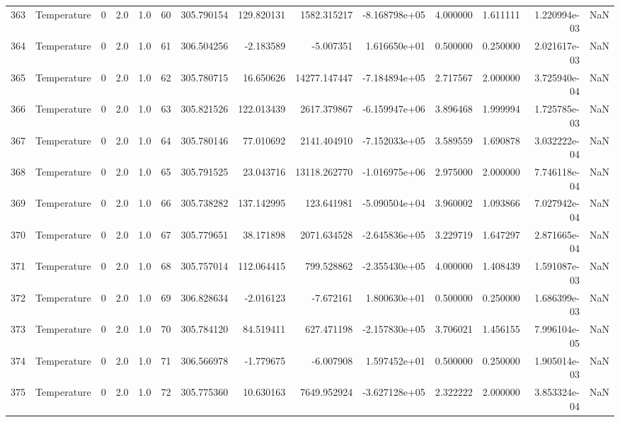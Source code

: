 \begin{tabular}{llrrrrrrrrrrrr}
363 &  Temperature &       0 &  2.0 &  1.0 &   60 &  305.790154 &   129.820131 &    1582.315217 & -8.168798e+05 &  4.000000 &  1.611111 &  1.220994e-03 &      NaN \\
364 &  Temperature &       0 &  2.0 &  1.0 &   61 &  306.504256 &    -2.183589 &      -5.007351 &  1.616650e+01 &  0.500000 &  0.250000 &  2.021617e-03 &      NaN \\
365 &  Temperature &       0 &  2.0 &  1.0 &   62 &  305.780715 &    16.650626 &   14277.147447 & -7.184894e+05 &  2.717567 &  2.000000 &  3.725940e-04 &      NaN \\
366 &  Temperature &       0 &  2.0 &  1.0 &   63 &  305.821526 &   122.013439 &    2617.379867 & -6.159947e+06 &  3.896468 &  1.999994 &  1.725785e-03 &      NaN \\
367 &  Temperature &       0 &  2.0 &  1.0 &   64 &  305.780146 &    77.010692 &    2141.404910 & -7.152033e+05 &  3.589559 &  1.690878 &  3.032222e-04 &      NaN \\
368 &  Temperature &       0 &  2.0 &  1.0 &   65 &  305.791525 &    23.043716 &   13118.262770 & -1.016975e+06 &  2.975000 &  2.000000 &  7.746118e-04 &      NaN \\
369 &  Temperature &       0 &  2.0 &  1.0 &   66 &  305.738282 &   137.142995 &     123.641981 & -5.090504e+04 &  3.960002 &  1.093866 &  7.027942e-04 &      NaN \\
370 &  Temperature &       0 &  2.0 &  1.0 &   67 &  305.779651 &    38.171898 &    2071.634528 & -2.645836e+05 &  3.229719 &  1.647297 &  2.871665e-04 &      NaN \\
371 &  Temperature &       0 &  2.0 &  1.0 &   68 &  305.757014 &   112.064415 &     799.528862 & -2.355430e+05 &  4.000000 &  1.408439 &  1.591087e-03 &      NaN \\
372 &  Temperature &       0 &  2.0 &  1.0 &   69 &  306.828634 &    -2.016123 &      -7.672161 &  1.800630e+01 &  0.500000 &  0.250000 &  1.686399e-03 &      NaN \\
373 &  Temperature &       0 &  2.0 &  1.0 &   70 &  305.784120 &    84.519411 &     627.471198 & -2.157830e+05 &  3.706021 &  1.456155 &  7.996104e-05 &      NaN \\
374 &  Temperature &       0 &  2.0 &  1.0 &   71 &  306.566978 &    -1.779675 &      -6.007908 &  1.597452e+01 &  0.500000 &  0.250000 &  1.905014e-03 &      NaN \\
375 &  Temperature &       0 &  2.0 &  1.0 &   72 &  305.775360 &    10.630163 &    7649.952924 & -3.627128e+05 &  2.322222 &  2.000000 &  3.853324e-04 &      NaN \\

\end{tabular}
